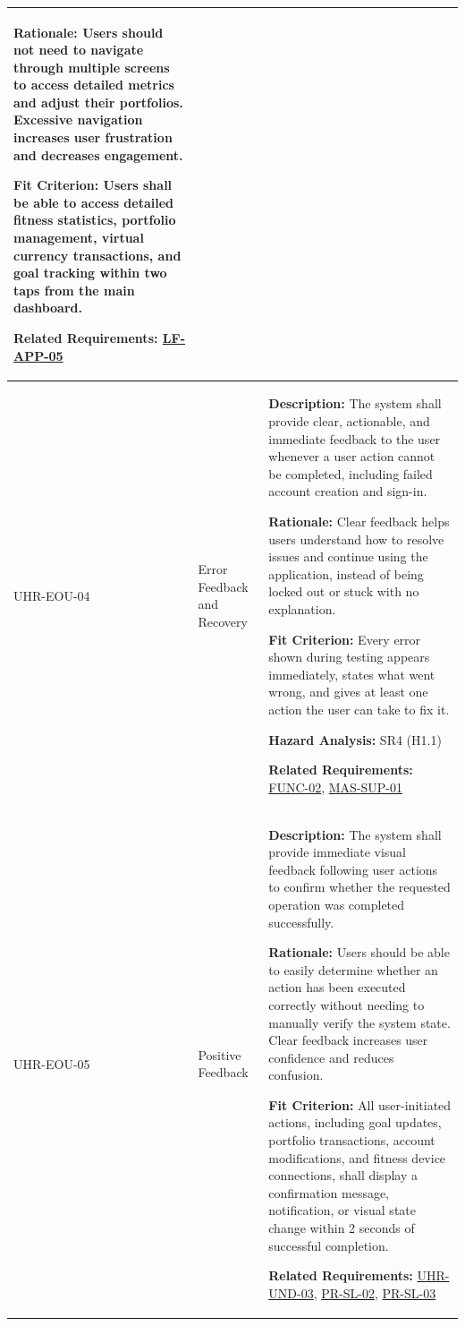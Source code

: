 \documentclass[12pt]{article}
\begin{document}
\begin{xltabular}{\textwidth}{|p{2.6cm}|p{3.4cm}|X|}
\textbf{Rationale:} Users should not need to navigate through multiple screens to access detailed metrics and adjust their portfolios. Excessive navigation increases user frustration and decreases engagement. 

\textbf{Fit Criterion:} Users shall be able to access detailed fitness statistics, portfolio management, virtual currency transactions, and goal tracking within two taps from the main dashboard.

\textbf{Related Requirements:} \hyperlink{req:LF-APP-05}{LF-APP-05}\\
\hline

UHR-EOU-04\hypertarget{req:UHR-EOU-04}{} &
Error Feedback and Recovery &
\textbf{Description:} The system shall provide clear, actionable, and immediate feedback to the user whenever a user action cannot be completed, including failed account creation and sign-in.

\textbf{Rationale:} Clear feedback helps users understand how to resolve issues and continue using the application, instead of being locked out or stuck with no explanation.

\textbf{Fit Criterion:} Every error shown during testing appears immediately, states what went wrong, and gives at least one action the user can take to fix it.

\textbf{Hazard Analysis:} SR4 (H1.1)

\textbf{Related Requirements:} \hyperlink{req:FUNC-02}{FUNC-02}, \hyperlink{req:MAS-SUP-01}{MAS-SUP-01}\\
\hline

UHR-EOU-05\hypertarget{req:UHR-EOU-05}{} & 
Positive Feedback & 
\textbf{Description:} The system shall provide immediate visual feedback following user actions to confirm whether the requested operation was completed successfully.

\textbf{Rationale:} Users should be able to easily determine whether an action has been executed correctly without needing to manually verify the system state. Clear feedback increases user confidence and reduces confusion.

\textbf{Fit Criterion:} All user-initiated actions, including goal updates, portfolio transactions, account modifications, and fitness device connections, shall display a confirmation message, notification, or visual state change within 2 seconds of successful completion.

\textbf{Related Requirements:} \hyperlink{req:UHR-UND-03}{UHR-UND-03}, \hyperlink{req:PR-SL-02}{PR-SL-02}, \hyperlink{req:PR-SL-03}{PR-SL-03}\\
\hline


\end{xltabular}
\end{document}
